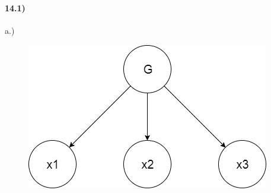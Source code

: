 \documentclass[12pt]{article}
\begin{document}
\maketitle\

\paragraph{14.1)}
a.)\\
\begin{figure}[h]
\includegraphics[scale=.5]{graph}
\end{figure}
\end{document}
